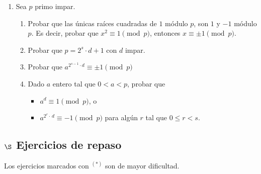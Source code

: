 \documentclass[a4paper,12pt,twoside,spanish,reqno]{amsbook}
\numberwithin{equation}{section}
\begin{document}
\begin{enumerate}
\item\label{ej-raiz-de-1-mod-p} Sea $p$ primo impar.  
    \begin{enumerate}
        \item Probar que las únicas raíces cuadradas de $1$ módulo $p$,  son $1$ y $-1$ módulo $p$. Es decir, probar que $x^2 \equiv 1 \pmod{p}$, entonces  $x \equiv \pm1 \pmod{p}$.
        \item Probar que   $p= 2^s \cdot d + 1$ con $d$ impar. 
        \item Probar que $a^{2^{s-1} \cdot d} \equiv \pm 1 \pmod{p}$
        \item Dado $a$ entero tal que $0 < a <p$, probar que 
        \begin{itemize}
            \item $a^{d} \equiv 1 \pmod{p}$, o
            \item $a^{2^r\cdot\, d} \equiv -1 \pmod{p}$  para algún $r$ tal que $0 \le r < s$.
        \end{itemize}
    \end{enumerate}


\end{enumerate}



\subsection*{$\S$ Ejercicios de repaso} Los ejercicios marcados con ${}^{(*)}$ son de mayor dificultad.
\end{document}
